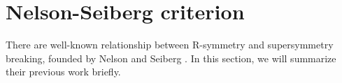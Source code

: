 \documentclass[a4paper,pdftex,10pt]{article}
\begin{document}
\maketitle

\tableofcontents

\clearpage
\section{Nelson-Seiberg criterion}

There are well-known relationship between R-symmetry and supersymmetry breaking, founded by Nelson and Seiberg \cite{Nelson:1993nf}. In this section, we will summarize their previous work briefly.











\clearpage



\nocite{Nelson:1993nf}
\nocite{Martin:1997ns}

\end{document}
